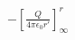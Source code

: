 \documentclass[preview]{standalone}
\begin{document}
\begin{align*}
- \left[ \frac{Q}{4\pi \epsilon_0 r'} \right]_{\infty}^{r}
\end{align*}
\end{document}
